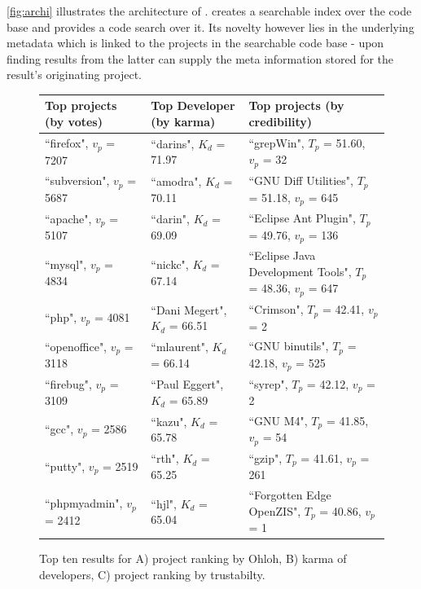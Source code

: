 \documentclass[10pt]{book}
\begin{document}
\autoref{fig:archi} illustrates the architecture of \Jbd. \Jbd creates a searchable index over the code base and provides a code search over it. Its novelty however lies in the underlying metadata which is linked to the projects in the searchable code base - upon finding results from the latter \Jbd can supply the meta information stored for the result's originating project.


\begin{figure}
{\small
  \centering
\begin{tabular}{ l | l | l }%
\textbf{Top projects (by votes)} & \textbf{Top Developer (by karma)} & \textbf{Top projects (by credibility)}
\\\hline
``firefox", $v_p$ = 7207 & ``darins", $K_{d}$ = 71.97 & ``grepWin", $T_{p}$ = 51.60, $v_p$ = 32
\\%
``subversion", $v_p$ = 5687 & ``amodra", $K_{d}$ = 70.11 & ``GNU Diff Utilities", $T_{p}$ = 51.18, $v_p$ = 645
\\%
``apache", $v_p$ = 5107 & ``darin", $K_{d}$ = 69.09 & ``Eclipse Ant Plugin", $T_{p}$ = 49.76, $v_p$ = 136
\\%
``mysql", $v_p$ = 4834 & ``nickc", $K_{d}$ = 67.14 & ``Eclipse Java Development Tools", $T_{p}$ = 48.36, $v_p$ = 647
\\%
``php", $v_p$ = 4081 & ``Dani Megert", $K_{d}$ = 66.51 & ``Crimson", $T_{p}$ = 42.41, $v_p$ = 2
\\%
``openoffice", $v_p$ = 3118 & ``mlaurent", $K_{d}$ = 66.14 & ``GNU binutils", $T_{p}$ = 42.18, $v_p$ = 525
\\%
``firebug", $v_p$ = 3109 & ``Paul Eggert", $K_{d}$ = 65.89 & ``syrep", $T_{p}$ = 42.12, $v_p$ = 2
\\%
``gcc", $v_p$ = 2586 & ``kazu", $K_{d}$ = 65.78 & ``GNU M4", $T_{p}$ = 41.85, $v_p$ = 54
\\%
``putty", $v_p$ = 2519 & ``rth", $K_{d}$ = 65.25 & ``gzip", $T_{p}$ = 41.61, $v_p$ = 261
\\%
``phpmyadmin", $v_p$ = 2412 & ``hjl", $K_{d}$ = 65.04 & ``Forgotten Edge OpenZIS", $T_{p}$ = 40.86, $v_p$ = 1
\\%
\end{tabular}
\caption{
{\small
Top ten results for A) project ranking by Ohloh, B) karma of developers, C) project ranking by trustabilty.
}}
\label{fig:table}
}
\end{figure}
\end{document}
